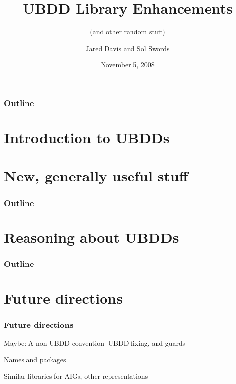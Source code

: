 \documentclass{beamer}
\title{UBDD Library Enhancements}
\subtitle{(and other random stuff)}
\author[Page \thepage]{Jared Davis and Sol Swords}
\date{November 5, 2008}
\institute{Centaur Technology}
\begin{document}


\maketitle
\logo{}

\begin{frame}
\frametitle{Outline}
\tableofcontents
\end{frame}

\section{Introduction to UBDDs}


\section{New, generally useful stuff}

\begin{frame}
\frametitle{Outline} \tableofcontents[currentsection]
\end{frame}







\section{Reasoning about UBDDs}
\begin{frame}
\frametitle{Outline} \tableofcontents[currentsection]
\end{frame}






\section{Future directions}

\begin{frame}
\frametitle{Future directions}

Maybe: A non-UBDD convention, UBDD-fixing, and guards

\SmallSkip

Names and packages

\SmallSkip

Similar libraries for AIGs, other representations

\end{frame}
\end{document}
